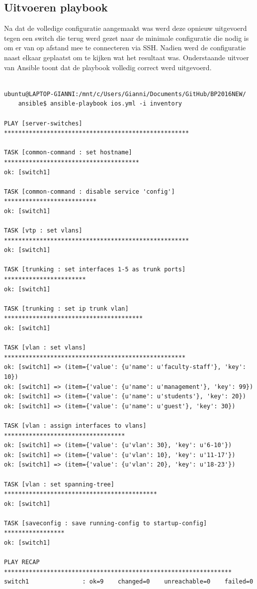 \subsection{Uitvoeren playbook}
\label{ch:ansibleplaybookexecution}

Na dat de volledige configuratie aangemaakt was werd deze opnieuw uitgevoerd tegen een switch die terug werd gezet naar de minimale configuratie die nodig is om er van op afstand mee te connecteren via SSH. Nadien werd de configuratie naast elkaar geplaatst om te kijken wat het resultaat was. Onderstaande uitvoer van Ansible toont dat de playbook volledig correct werd uitgevoerd.

\begin{center}
\begin{Verbatim}

ubuntu@LAPTOP-GIANNI:/mnt/c/Users/Gianni/Documents/GitHub/BP2016NEW/
    ansible$ ansible-playbook ios.yml -i inventory

PLAY [server-switches] ****************************************************

TASK [common-command : set hostname] **************************************
ok: [switch1]

TASK [common-command : disable service 'config'] **************************
ok: [switch1]

TASK [vtp : set vlans] ****************************************************
ok: [switch1]

TASK [trunking : set interfaces 1-5 as trunk ports] ***********************
ok: [switch1]

TASK [trunking : set ip trunk vlan] ***************************************
ok: [switch1]

TASK [vlan : set vlans] ***************************************************
ok: [switch1] => (item={'value': {u'name': u'faculty-staff'}, 'key': 10})
ok: [switch1] => (item={'value': {u'name': u'management'}, 'key': 99})
ok: [switch1] => (item={'value': {u'name': u'students'}, 'key': 20})
ok: [switch1] => (item={'value': {u'name': u'guest'}, 'key': 30})

TASK [vlan : assign interfaces to vlans] **********************************
ok: [switch1] => (item={'value': {u'vlan': 30}, 'key': u'6-10'})
ok: [switch1] => (item={'value': {u'vlan': 10}, 'key': u'11-17'})
ok: [switch1] => (item={'value': {u'vlan': 20}, 'key': u'18-23'})

TASK [vlan : set spanning-tree] *******************************************
ok: [switch1]

TASK [saveconfig : save running-config to startup-config] *****************
ok: [switch1]

PLAY RECAP ****************************************************************
switch1               : ok=9    changed=0    unreachable=0    failed=0

\end{Verbatim}
\end{center}

